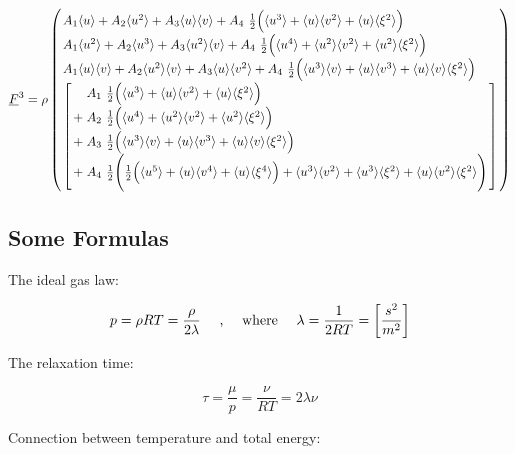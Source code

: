 \documentclass[
	pdftex,             %
	12pt,				%
	a4paper,		   	%
	english,				%
	oneside,			%
]{article}
\newcommand{\mom}[1]{\langle #1 \rangle}
\newcommand{\uu}[1]{\underline{#1}}
\begin{document}
\begin{equation}
\arraycolsep=1.4pt\def\arraystretch{1.5}
\uu{F}^3
=
\rho
\left(
\begin{array}{l}
    A_1 \mom{u} + 
    A_2 \mom{u^2} + 
    A_3 \mom{u}\mom{v}+ 
    A_4 ~\tfrac{1}{2} \Big( \mom{u^3} + \mom{u}\mom{v^2} + \mom{u}\mom{\xi^2} \Big)
\\
    A_1 \mom{u^2} + 
    A_2 \mom{u^3} + 
    A_3 \mom{u^2}\mom{v}+ 
    A_4 ~\tfrac{1}{2} \Big( \mom{u^4} + \mom{u^2}\mom{v^2} + \mom{u^2}\mom{\xi^2} \Big)
\\
    A_1 \mom{u}\mom{v} + 
    A_2 \mom{u^2}\mom{v} + 
    A_3 \mom{u}\mom{v^2}+ 
    A_4 ~\tfrac{1}{2} \Big( \mom{u^3}\mom{v} + \mom{u}\mom{v^3} + \mom{u}\mom{v}\mom{\xi^2} \Big)
\\
\left[
\begin{array}{ll}
  &	A_1 ~\tfrac{1}{2} \Big( \mom{u^3} + \mom{u}\mom{v^2} + \mom{u}\mom{\xi^2} \Big) \\
+ &	A_2 ~\tfrac{1}{2} \Big( \mom{u^4} + \mom{u^2}\mom{v^2} + \mom{u^2}\mom{\xi^2} \Big) \\
+ & A_3 ~\tfrac{1}{2} \Big( \mom{u^3}\mom{v} + \mom{u}\mom{v^3} + \mom{u}\mom{v}\mom{\xi^2} \Big) \\
+ & A_4 ~\tfrac{1}{2} \Bigg( \tfrac{1}{2} \Big( \mom{u^5} + \mom{u}\mom{v^4} + \mom{u}\mom{\xi^4} \Big)
						  + \mom{u^3}\mom{v^2} + \mom{u^3}\mom{\xi^2} + \mom{u}\mom{v^2}\mom{\xi^2} \Bigg)
\end{array}
\right]
\end{array}
\right)
\end{equation}

\clearpage
\subsection{Some Formulas}

The ideal gas law:

\begin{equation}
p = \rho RT = \dfrac{\rho}{2 \lambda}
\textnormal{~~~~,~~~~where~~~~}
\lambda = \frac{1}{2RT} = \left[ \dfrac{s^2}{m^2} \right]
\end{equation}

The relaxation time:

\begin{equation}
\tau = \frac{\mu}{p} = \frac{\nu}{RT} = 2\lambda\nu
\end{equation}

Connection between temperature and total energy:
\end{document}
